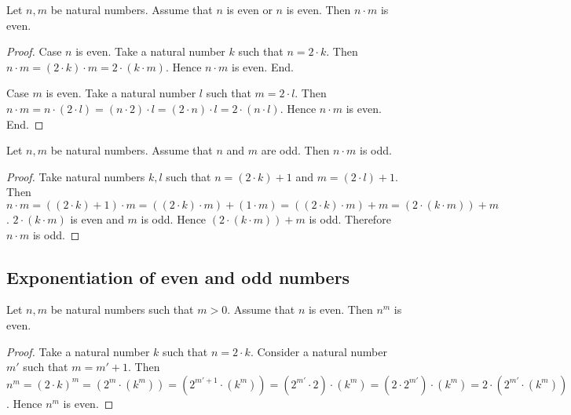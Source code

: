 \documentclass[10pt]{article}
\begin{document}
  \begin{forthel}
    \begin{proposition}
      Let $n, m$ be natural numbers.
      Assume that $n$ is even or $n$ is even.
      Then $n \cdot m$ is even.
    \end{proposition}
    \begin{proof}
      Case $n$ is even.
        Take a natural number $k$ such that $n = 2 \cdot k$.
        Then $n \cdot m =
        (2 \cdot k) \cdot m =
        2 \cdot (k \cdot m)$.
        Hence $n \cdot m$ is even.
      End.

      Case $m$ is even.
        Take a natural number $l$ such that $m = 2 \cdot l$.
        Then $n \cdot m =
        n \cdot (2 \cdot l) =
        (n \cdot 2) \cdot l =
        (2 \cdot n) \cdot l =
        2 \cdot (n \cdot l)$.
        Hence $n \cdot m$ is even.
      End.
    \end{proof}
  \end{forthel}

  \begin{forthel}
    \begin{proposition}
      Let $n, m$ be natural numbers.
      Assume that $n$ and $m$ are odd.
      Then $n \cdot m$ is odd.
    \end{proposition}
    \begin{proof}
      Take natural numbers $k, l$ such that $n = (2 \cdot k) + 1$ and $m = (2 \cdot l) + 1$.
      Then $n \cdot m =
      ((2 \cdot k) + 1) \cdot m =
      ((2 \cdot k) \cdot m) + (1 \cdot m) =
      ((2 \cdot k) \cdot m) + m =
      (2 \cdot (k \cdot m)) + m$.
      $2 \cdot (k \cdot m)$ is even and $m$ is odd.
      Hence $(2 \cdot (k \cdot m)) + m$ is odd.
      Therefore $n \cdot m$ is odd.
    \end{proof}
  \end{forthel}


  \subsection{Exponentiation of even and odd numbers}

  \begin{forthel}
    \begin{proposition}
      Let $n, m$ be natural numbers such that $m > 0$.
      Assume that $n$ is even.
      Then $n^{m}$ is even.
    \end{proposition}
    \begin{proof}
      Take a natural number $k$ such that $n = 2 \cdot k$.
      Consider a natural number $m'$ such that $m = m' + 1$.
      Then $n^{m} =
      (2 \cdot k)^{m} =
      (2^{m} \cdot (k^{m})) =
      (2^{m' + 1} \cdot (k^{m})) =
      (2^{m'} \cdot 2) \cdot (k^{m}) =
      (2 \cdot 2^{m'}) \cdot (k^{m}) =
      2 \cdot (2^{m'} \cdot (k^{m}))$.
      Hence $n^{m}$ is even.
    \end{proof}
  \end{forthel}
\end{document}
